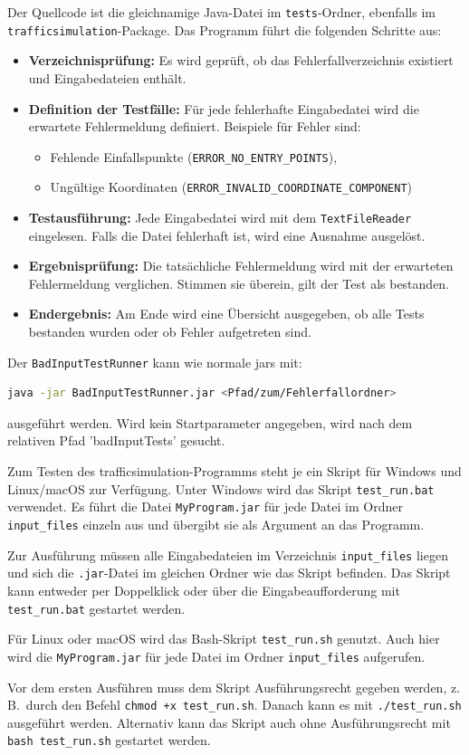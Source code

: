 Der Quellcode ist die gleichnamige Java-Datei im \texttt{tests}-Ordner, ebenfalls im \\
\texttt{trafficsimulation}-Package. 
Das Programm führt die folgenden Schritte aus:

\begin{itemize}
    \item \textbf{Verzeichnisprüfung:} Es wird geprüft, ob das Fehlerfallverzeichnis existiert und Eingabedateien enthält.
    \item \textbf{Definition der Testfälle:} Für jede fehlerhafte Eingabedatei wird die erwartete Fehlermeldung definiert. Beispiele für Fehler sind:
    \begin{itemize}
        \item Fehlende Einfallspunkte (\texttt{ERROR\_NO\_ENTRY\_POINTS}),
        \item Ungültige Koordinaten (\texttt{ERROR\_INVALID\_COORDINATE\_COMPONENT})
    \end{itemize}
    \item \textbf{Testausführung:} Jede Eingabedatei wird mit dem \texttt{TextFileReader} eingelesen. Falls die Datei fehlerhaft ist, wird eine Ausnahme ausgelöst.
    \item \textbf{Ergebnisprüfung:} Die tatsächliche Fehlermeldung wird mit der erwarteten Fehlermeldung verglichen. Stimmen sie überein, gilt der Test als bestanden.
    \item \textbf{Endergebnis:} Am Ende wird eine Übersicht ausgegeben, ob alle Tests bestanden wurden oder ob Fehler aufgetreten sind.
\end{itemize}

Der \texttt{BadInputTestRunner} kann wie normale jars mit:
    \begin{lstlisting}[language=bash]
java -jar BadInputTestRunner.jar <Pfad/zum/Fehlerfallordner>
    \end{lstlisting}
ausgeführt werden.
Wird kein Startparameter angegeben, wird nach dem relativen Pfad 'badInputTests' gesucht.


Zum Testen des trafficsimulation-Programms steht je ein Skript für Windows und Linux/macOS zur Verfügung. Unter Windows wird das Skript \texttt{test\_run.bat} verwendet.
Es führt die Datei \texttt{MyProgram.jar} für jede Datei im Ordner \texttt{input\_files} einzeln aus und übergibt sie als Argument an das Programm.

Zur Ausführung müssen alle Eingabedateien im Verzeichnis \texttt{input\_files} liegen und sich die \texttt{.jar}-Datei im gleichen Ordner wie das Skript befinden.
Das Skript kann entweder per Doppelklick oder über die Eingabeaufforderung mit \texttt{test\_run.bat} gestartet werden.

Für Linux oder macOS wird das Bash-Skript \texttt{test\_run.sh} genutzt. Auch hier wird die \texttt{MyProgram.jar} für jede Datei im Ordner \texttt{input\_files} aufgerufen.

Vor dem ersten Ausführen muss dem Skript Ausführungsrecht gegeben werden, z.\,B.\ durch den Befehl \texttt{chmod +x test\_run.sh}. Danach kann es mit \texttt{./test\_run.sh} ausgeführt werden.
Alternativ kann das Skript auch ohne Ausführungsrecht mit \texttt{bash test\_run.sh} gestartet werden.